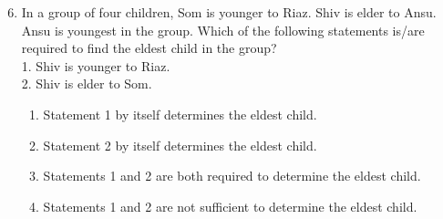 \documentclass[journal,12pt,onecolumn]{IEEEtran}
\theoremstyle{remark}
\begin{document}
\begin{enumerate}
\setcounter{enumi}{5}

    \item In a group of four children, Som is younger to Riaz. Shiv is elder to Ansu. Ansu is youngest in the group. Which of the following statements is/are required to find the eldest child in the group? \\
    1. Shiv is younger to Riaz. \\
    2. Shiv is elder to Som.
    \begin{enumerate}
        \item Statement 1 by itself determines the eldest child.
        \item Statement 2 by itself determines the eldest child.
        \item Statements 1 and 2 are both required to determine the eldest child.
        \item Statements 1 and 2 are not sufficient to determine the eldest child.
    \end{enumerate}

    \vspace{0.5cm}
    

\end{enumerate}
\end{document}
